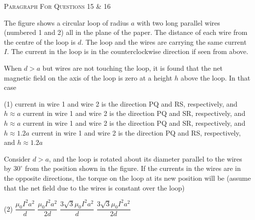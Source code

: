 
\begin{center}
    \textsc{Paragraph For Questions 15 \& 16}
\end{center}

The figure shows a circular loop of radius $a$ with two long parallel wires (numbered 1 and 2) all in the plane of the paper. The distance of each wire from the centre of the loop is $d$. The loop and the wires are carrying the same current $I$. The current in the loop is in the counterclockwise direction if seen from above.

\begin{center}
    \begin{tikzpicture}
    \end{tikzpicture}
\end{center} 

\item When $d > a$ but wires are not touching the loop, it is found that the net magnetic field on the axis of the loop is zero at a height $h$ above the loop. In that case
    \begin{tasks}(1)
        \task current in wire 1 and wire 2 is the direction PQ and RS, respectively, and $h \approx a$
        \task current in wire 1 and wire 2 is the direction PQ and SR, respectively, and $h \approx a$
        \task current in wire 1 and wire 2 is the direction PQ and SR, respectively, and $h \approx 1.2a$
        \task current in wire 1 and wire 2 is the direction PQ and RS, respectively, and $h \approx 1.2a$
    \end{tasks}

\item Consider $d > a$, and the loop is rotated about its diameter parallel to the wires by $30^\circ$ from the position shown in the figure. If the currents in the wires are in the opposite directions, the torque on the loop at its new position will be (assume that the net field due to the wires is constant over the loop)
    \begin{tasks}(2)
        \task $\dfrac{\mu_0 I^2 a^2}{d}$
        \task $\dfrac{\mu_0 I^2 a^2}{2d}$
        \task $\dfrac{3\sqrt{3} \mu_0 I^2 a^2}{d}$
        \task $\dfrac{3\sqrt{3} \mu_0 I^2 a^2}{2d}$
    \end{tasks}
